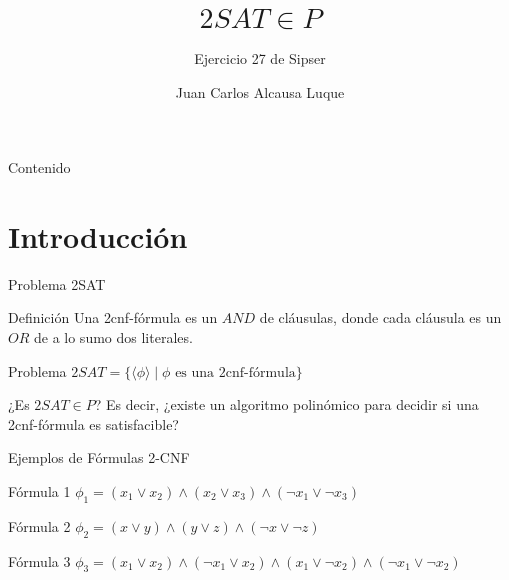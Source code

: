 \documentclass{beamer}
\title{$2SAT \in P$}
\subtitle{Ejercicio 27 de Sipser}
\author{Juan Carlos Alcausa Luque}
\institute{Universidad de Málaga}
\date{}
\begin{document}
\begin{frame}
\titlepage
\end{frame}

\begin{frame}{Contenido}
\tableofcontents
\end{frame}

\section{Introducción}
\begin{frame}{Problema 2SAT}
\begin{block}{Definición}
Una \alert{2cnf-fórmula} es un $AND$ de cláusulas, donde cada cláusula es un $OR$ de \alert{a lo sumo dos literales}.
\end{block}

\begin{block}{Problema}
$2SAT = \{\langle \phi \rangle \mid \phi \text{ es una 2cnf-fórmula} \}$

\vspace{0.3cm}
¿Es $2SAT \in P$? Es decir, ¿existe un algoritmo polinómico para decidir si una 2cnf-fórmula es satisfacible?
\end{block}
\end{frame}

\begin{frame}{Ejemplos de Fórmulas 2-CNF}
	\begin{block}{Fórmula 1}
	$\phi_1 = (x_1 \lor x_2) \land (x_2 \lor x_3) \land (\neg x_1 \lor \neg x_3)$
	\end{block}
	
	\begin{block}{Fórmula 2}
	$\phi_2 = (x \lor y) \land (y \lor z) \land (\neg x \lor \neg z)$
	\end{block}
	
	\begin{block}{Fórmula 3}
	$\phi_3 = (x_1 \lor x_2) \land (\neg x_1 \lor x_2) \land (x_1 \lor \neg x_2) \land (\neg x_1 \lor \neg x_2)$
	\end{block}
\end{frame}
\end{document}
